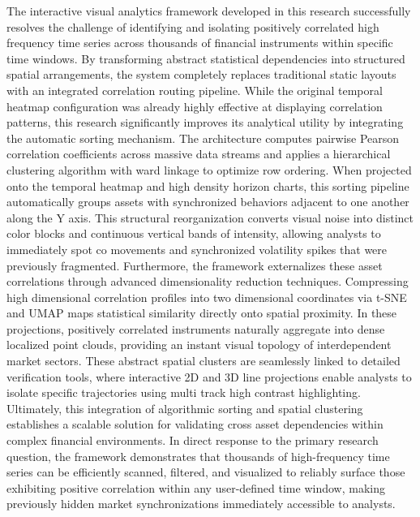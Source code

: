 \documentclass[final,3p,times,twocolumn]{elsarticle}
\begin{document}
The interactive visual analytics framework developed in this research successfully resolves the challenge of identifying and isolating positively correlated high frequency time series across thousands of financial instruments within specific time windows. By transforming abstract statistical dependencies into structured spatial arrangements, the system completely replaces traditional static layouts with an integrated correlation routing pipeline.
While the original temporal heatmap configuration was already highly effective at displaying correlation patterns, this research significantly improves its analytical utility by integrating the automatic sorting mechanism. The architecture computes pairwise Pearson correlation coefficients across massive data streams and applies a hierarchical clustering algorithm with ward linkage to optimize row ordering. When projected onto the temporal heatmap and high density horizon charts, this sorting pipeline automatically groups assets with synchronized behaviors adjacent to one another along the Y axis. This structural reorganization converts visual noise into distinct color blocks and continuous vertical bands of intensity, allowing analysts to immediately spot co movements and synchronized volatility spikes that were previously fragmented.
Furthermore, the framework externalizes these asset correlations through advanced dimensionality reduction techniques. Compressing high dimensional correlation profiles into two dimensional coordinates via t-SNE and UMAP maps statistical similarity directly onto spatial proximity. In these projections, positively correlated instruments naturally aggregate into dense localized point clouds, providing an instant visual topology of interdependent market sectors. These abstract spatial clusters are seamlessly linked to detailed verification tools, where interactive 2D and 3D line projections enable analysts to isolate specific trajectories using multi track high contrast highlighting. Ultimately, this integration of algorithmic sorting and spatial clustering establishes a scalable solution for validating cross asset dependencies within complex financial environments. In direct response to the primary research question, the framework demonstrates that thousands of high-frequency time series can be efficiently scanned, filtered, and visualized to reliably surface those exhibiting positive correlation within any user-defined time window, making previously hidden market synchronizations immediately accessible to analysts.
\end{document}
